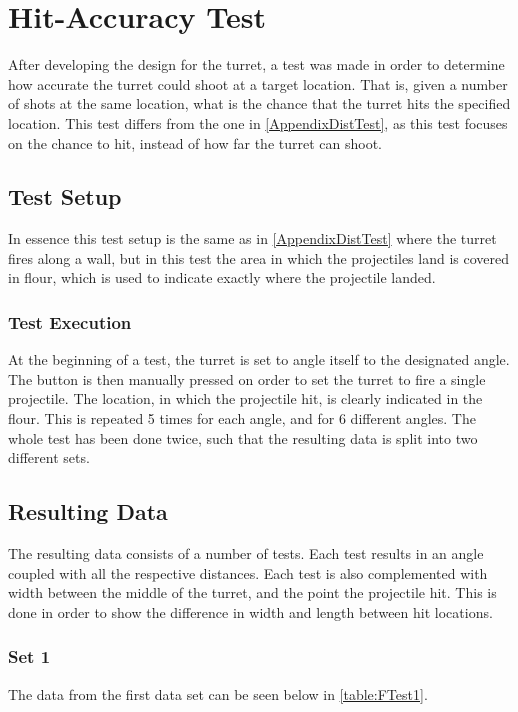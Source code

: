 \chapter{Hit-Accuracy Test}\label{AppendixAccTest}
After developing the design for the turret, a test was made in order to
determine how accurate the turret could shoot at a target location. That is,
given a number of shots at the same location, what is the chance that the turret
hits the specified location. This test differs from the one in
\autoref{AppendixDistTest}, as this test focuses on the chance to hit, instead
of how far the turret can shoot.

\section{Test Setup}
In essence this test setup is the same as in \autoref{AppendixDistTest} where
the turret fires along a wall, but in this test the area in which the
projectiles land is covered in flour, which is used to indicate exactly
where the projectile landed.

\subsection{Test Execution}
At the beginning of a test, the turret is set to angle itself to the designated
angle. The button is then manually pressed on order to set the turret to fire a
single projectile. The location, in which the projectile hit, is clearly
indicated in the flour. This is repeated 5 times for each angle, and for 6
different angles. The whole test has been done twice, such that the resulting
data is split into two different sets.

\section{Resulting Data}
The resulting data consists of a number of tests. Each test results in an angle
coupled with all the respective distances. Each test is also complemented with
width between the middle of the turret, and the point the projectile hit. This
is done in order to show the difference in width and length between hit
locations.

\subsection{Set 1}
The data from the first data set can be seen below in \autoref{table:FTest1}. 


